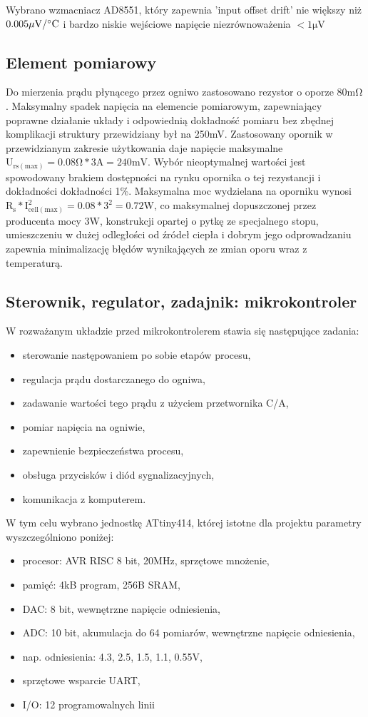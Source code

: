 \documentclass[polish,engineer]{polsl-msth}
\begin{document}
Wybrano wzmacniacz AD8551, który zapewnia 'input offset drift' nie większy niż $\mathrm{0.005 \mu V/\degree C}$ i bardzo niskie wejściowe napięcie niezrównoważenia $\mathrm{<1\mu V}$
\subsection{Element pomiarowy}
Do mierzenia prądu płynącego przez ogniwo zastosowano rezystor o oporze $\mathrm{80m\Omega}$. Maksymalny spadek napięcia na elemencie pomiarowym, zapewniający poprawne działanie układy i odpowiednią dokładność pomiaru bez zbędnej komplikacji struktury przewidziany był na 250mV. Zastosowany opornik w przewidzianym zakresie użytkowania daje napięcie maksymalne $\mathrm{U_{rs(max)}=0.08\Omega * 3A = 240mV}$. Wybór nieoptymalnej wartości jest spowodowany brakiem dostępności na rynku opornika o tej rezystancji i dokładności dokładności 1\%. Maksymalna moc wydzielana na oporniku wynosi $\mathrm{R_s*I_{cell(max)}^2 = 0.08*3^2 = 0.72W}$, co maksymalnej dopuszczonej przez producenta mocy 3W, konstrukcji opartej o pytkę ze specjalnego stopu, umieszczeniu w dużej odległości od źródeł ciepła i dobrym jego odprowadzaniu zapewnia minimalizację błędów wynikających ze zmian oporu wraz z temperaturą.
\subsection{Sterownik, regulator, zadajnik: mikrokontroler}
W rozważanym układzie przed mikrokontrolerem stawia się następujące zadania:
\begin{itemize}
    \item sterowanie następowaniem po sobie etapów procesu,
    \item regulacja prądu dostarczanego do ogniwa,
    \item zadawanie wartości tego prądu z użyciem przetwornika C/A,
    \item pomiar napięcia na ogniwie,
    \item zapewnienie bezpieczeństwa procesu,
    \item obsługa przycisków i diód sygnalizacyjnych,
    \item komunikacja z komputerem.
\end{itemize}
W tym celu wybrano jednostkę ATtiny414, której istotne dla projektu parametry wyszczególniono poniżej:
\begin{itemize}
    \item procesor: AVR RISC 8 bit, 20MHz, sprzętowe mnożenie,
    \item pamięć: 4kB program, 256B SRAM,
    \item DAC: 8 bit, wewnętrzne napięcie odniesienia,
    \item ADC: 10 bit, akumulacja do 64 pomiarów, wewnętrzne napięcie odniesienia, 
    \item nap. odniesienia: 4.3, 2.5, 1.5, 1.1, 0.55V,
    \item sprzętowe wsparcie UART,
    \item I/O: 12 programowalnych linii
\end{itemize}
\end{document}
